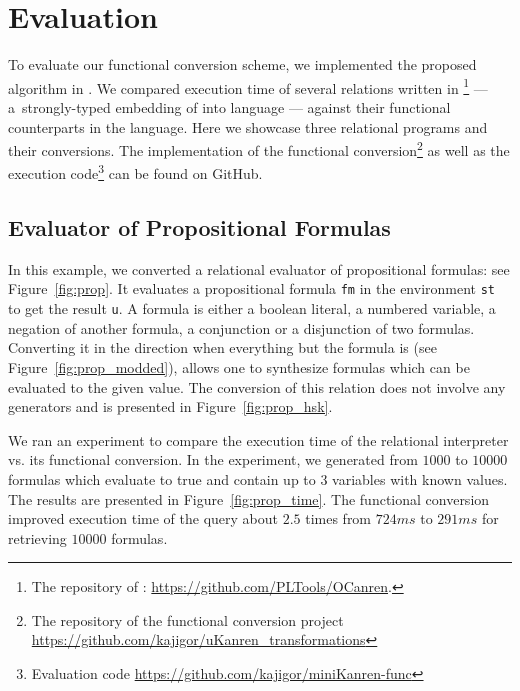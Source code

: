\section{Evaluation}
\label{sec:evaluation}

To evaluate our functional conversion scheme, we implemented the proposed algorithm in \haskell.
We compared execution time of several relations written in \ocanren\footnote{The repository of \ocanren: \url{https://github.com/PLTools/OCanren}.} --- a~strongly-typed embedding of \mk into \ocaml language --- against their functional counterparts in the \ocaml language.
Here we showcase three relational programs and their conversions.
The implementation of the functional conversion\footnote{The repository of the functional conversion project \url{https://github.com/kajigor/uKanren_transformations}} as well as the execution code\footnote{Evaluation code \url{https://github.com/kajigor/miniKanren-func}} can be found on GitHub.



\subsection{Evaluator of Propositional Formulas}

In this example, we converted a relational evaluator of propositional formulas: see Figure~\ref{fig:prop}.
It evaluates a propositional formula \lstinline{fm} in the environment \lstinline{st} to get the result \lstinline{u}.
A formula is either a boolean literal, a numbered variable, a negation of another formula, a conjunction or a disjunction of two formulas.
Converting it in the direction when everything but the formula is \inm (see Figure~\ref{fig:prop_modded}), allows one to synthesize formulas which can be evaluated to the given value.
The conversion of this relation does not involve any generators and is presented in Figure~\ref{fig:prop_hsk}.

We ran an experiment to compare the execution time of the relational interpreter vs. its functional conversion.
In the experiment, we generated from $1000$ to $10000$ formulas which evaluate to true and contain up to $3$ variables with known values.
The results are presented in Figure~\ref{fig:prop_time}.
The functional conversion improved execution time of the query about $2.5$ times from $724ms$ to $291ms$ for retrieving $10000$ formulas.






